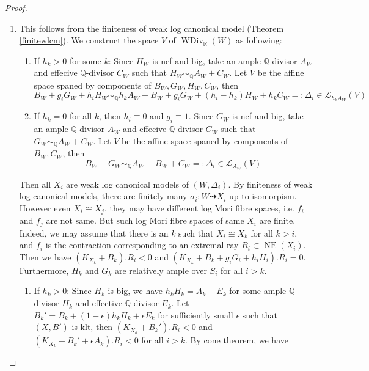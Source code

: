 \documentclass{article}
\begin{document}
\begin{proof}
\begin{enumerate}
  \item This follows from the finiteness of weak log canonical model (Theorem \ref{finitewlcm}). We construct the space $V$ of $\operatorname{WDiv}_{\mathbb{R}}(W)$ as following: 
\begin{enumerate}
  \item If $h_{k}>0$ for some $k$: Since $H_{W}$ is nef and big,  take an  ample $\mathbb{Q}$-divisor $A_{W}$ and effecive $\mathbb{Q}$-divisor $C_{W}$  such that $H_{W}\sim_{\mathbb{Q}}A_{W}+C_{W}$. Let $V$ be the affine space spaned by components of  $B_{W},G_{W},H_{W},C_{W}$, then 
    \[
      B_{W}+g_{i}G_{W}+h_{i}H_{W}\sim_{\mathbb{Q}} h_{k}A_{W}+B_{W}+g_{i}G_{W}+(h_{i}-h_{k})H_{W}+h_{k}C_{W}=:\Delta_{i} \in \mathcal{L}_{h_{k}A_{W}}(V)
    \]
  \item If $h_{k}=0$ for all $k$, then $h_{i}\equiv 0$ and $g_{i}\equiv 1$.  Since $G_{W}$ is nef and big,  take  an  ample $\mathbb{Q}$-divisor $A_{W}$ and effecive $\mathbb{Q}$-divisor $C_{W}$  such that $G_{W}\sim_{\mathbb{Q}}A_{W}+C_{W}$. Let $V$ be the affine space spaned by components of  $B_{W},C_{W}$, then 
    \[
      B_{W}+G_{W}\sim_{\mathbb{Q}} A_{W}+B_{W}+C_{W}=:\Delta_{i} \in \mathcal{L}_{A_{W}}(V)
    \]
\end{enumerate}
Then all $X_{i}$ are weak log canonical models of $(W,\Delta_{i})$. By finiteness of weak log canonical models, there are finitely many $\sigma_{i}:W\dashrightarrow X_{i}$ up to isomorpism. However even $X_{i} \cong X_{j}$, they may have different log Mori fibre spaces, i.e. $f_{i}$ and $f_{j}$ are not same. But such log Mori fibre spaces of same $X_{i}$ are finite.
Indeed, we may assume that there is an $k$ such that $X_{i} \cong X_{k}$ for all $k>i$, and  $f_{i}$ is the contraction corresponding to an extremal ray $R_{i} \subset \overline{\operatorname{NE}}(X_{i}) $. Then we have $(K_{X_{k}}+B_{k}).R_{i}<0  $ and $(K_{X_{k}}+B_{k}+g_{i}G_{i}+h_{i}H_{i}).R_{i}=0$. Furthermore, $H_{k}$ and $G_{k}$ are relatively ample over $S_{i}$ for all $i>k$.
\begin{enumerate}
\item If $h_{k}>0$: Since $H_{k}$ is big, we have $h_{k}H_{k}=A_{k}+E_{k}$ for some ample $\mathbb{Q}$-divisor $H_{k}$ and effective $\mathbb{Q}$-divisor  $E_{k}$. Let $B_{k}'=B_{k}+(1-\epsilon)h_{k}H_{k}+\epsilon E_{k}$ for sufficiently small $\epsilon$ such that $(X,B')$ is klt, then $(K_{X_{k}}+B_{k}').R_{i}<0$ and $(K_{X_{k}}+B_{k}'+\epsilon A_{k}).R_{i}<0$ for all $i>k$. By cone theorem, we have 

\end{enumerate}
\end{enumerate}
\end{proof}
\end{document}
